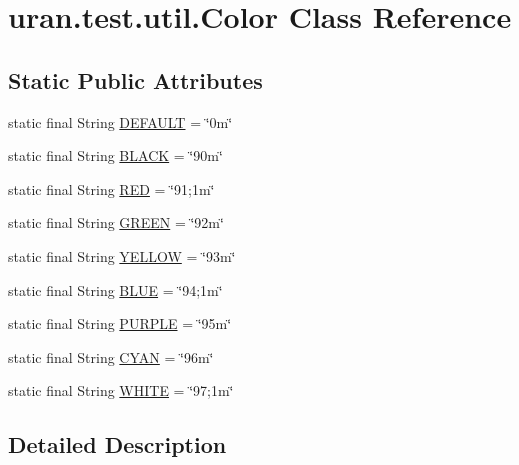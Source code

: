 \hypertarget{classuran_1_1test_1_1util_1_1_color}{}\section{uran.\+test.\+util.\+Color Class Reference}
\label{classuran_1_1test_1_1util_1_1_color}
\subsection*{Static Public Attributes}
\begin{DoxyCompactItemize}
\item 
static final String \hyperlink{classuran_1_1test_1_1util_1_1_color_a0aa0c7ad1c0cae1f92f52617bea0dba4}{D\+E\+F\+A\+U\+L\+T} = \char`\"{}0m\char`\"{}
\item 
static final String \hyperlink{classuran_1_1test_1_1util_1_1_color_aa5319694234f29d8952f96f279183b29}{B\+L\+A\+C\+K} = \char`\"{}90m\char`\"{}
\item 
static final String \hyperlink{classuran_1_1test_1_1util_1_1_color_a7b82d8a5edcacd707d0635fd76729bd0}{R\+E\+D} = \char`\"{}91;1m\char`\"{}
\item 
static final String \hyperlink{classuran_1_1test_1_1util_1_1_color_af42bb24cdda43238ac00f6b76d91566c}{G\+R\+E\+E\+N} = \char`\"{}92m\char`\"{}
\item 
static final String \hyperlink{classuran_1_1test_1_1util_1_1_color_a7b786075805d569ab175e9f39992bf7e}{Y\+E\+L\+L\+O\+W} = \char`\"{}93m\char`\"{}
\item 
static final String \hyperlink{classuran_1_1test_1_1util_1_1_color_a3e5cae93909f68b41b95143eb0576e82}{B\+L\+U\+E} = \char`\"{}94;1m\char`\"{}
\item 
static final String \hyperlink{classuran_1_1test_1_1util_1_1_color_aa3380d5487a2d1613fee44a3cbdf78e1}{P\+U\+R\+P\+L\+E} = \char`\"{}95m\char`\"{}
\item 
static final String \hyperlink{classuran_1_1test_1_1util_1_1_color_a9357dc8aa61fa16f56e8c1b37097dc50}{C\+Y\+A\+N} = \char`\"{}96m\char`\"{}
\item 
static final String \hyperlink{classuran_1_1test_1_1util_1_1_color_a44ada8df1da64ed443e420cf6a6cbbd8}{W\+H\+I\+T\+E} = \char`\"{}97;1m\char`\"{}
\end{DoxyCompactItemize}


\subsection{Detailed Description}


